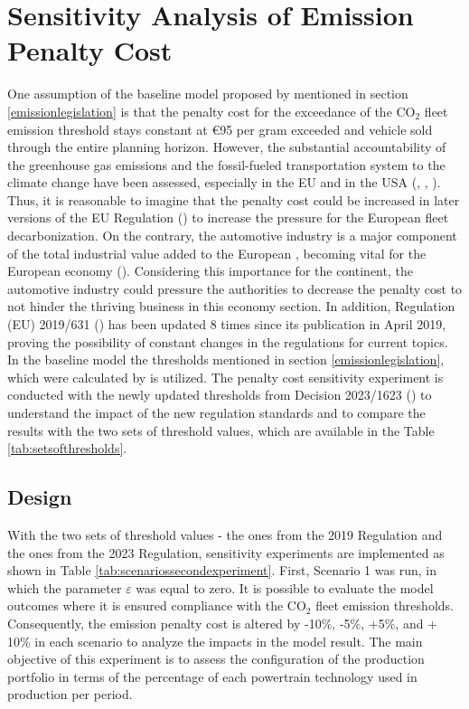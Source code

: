 \section{Sensitivity Analysis of Emission Penalty Cost}\label{section:Experiment 2}
One assumption of the baseline model proposed by \cite{mainreference_thies} mentioned in section \ref{emissionlegislation} is that the penalty cost for the exceedance of the $\text{CO}_{2}$ fleet emission threshold stays constant at \euro{95} per gram exceeded and vehicle sold through the entire planning horizon. However, the substantial accountability of the greenhouse gas emissions and the fossil-fueled transportation system to the climate change have been assessed, especially in the EU and in the USA (\cite{Urain2022}, \cite{Kinney2018179}, \cite{WENDEKER2022118439}). Thus, it is reasonable to imagine that the penalty cost could be increased in later versions of the EU Regulation (\cite{european2019regulation}) to increase the pressure for the European fleet decarbonization. On the contrary, the automotive industry is a major component of the total industrial value added to the European , becoming vital for the European economy (\cite{Demiraj2022}). Considering this importance for the continent, the automotive industry could pressure the authorities to decrease the penalty cost to not hinder the thriving business in this economy section. In addition, Regulation (EU) 2019/631 (\cite{european2019regulation}) has been updated 8 times since its publication in April 2019, proving the possibility of constant changes in the regulations for current topics. In the baseline model the thresholds mentioned in section \ref{emissionlegislation}, which were calculated by \cite{mainreference_thies} is utilized. The penalty cost sensitivity experiment is conducted with the newly updated thresholds from Decision 2023/1623 (\cite{european2023newregulation}) to understand the impact of the new regulation standards and to compare the results with the two sets of threshold values, which are available in the Table \ref{tab:setsofthresholds}.\\

\subsection{Design}\label{designexperiment2}
With the two sets of threshold values - the ones from the 2019 Regulation and the ones from the 2023 Regulation, sensitivity experiments are implemented as shown in Table \ref{tab:scenariossecondexperiment}. First, Scenario 1 was run, in which the parameter $\varepsilon$ was equal to zero. It is possible to evaluate the model outcomes where it is ensured compliance with the $\text{CO}_{2}$ fleet emission thresholds. Consequently, the emission penalty cost is altered by -10\%, -5\%, +5\%, and + 10\% in each scenario to analyze the impacts in the model result. The main objective of this experiment is to assess the configuration of the production portfolio in terms of the percentage of each powertrain technology used in production per period. \\

